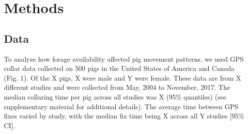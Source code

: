 \documentclass[a4paper]{article}
\begin{document}





\section*{Methods}

\subsection*{Data}

To analyze how forage availability affected pig movement patterns, we used GPS collar data collected on 500 pigs in the United States of America and Canada (Fig. 1).  Of the X pigs, X were male and Y were female. These data are from X different studies and were collected from May, 2004 to November, 2017.  The median collaring time per pig across all studies was X (95\% quantiles) (see supplementary material for additional details). The average time between GPS fixes varied by study, with the median fix time being X across all Y studies [95\% CI]. 
\end{document}
